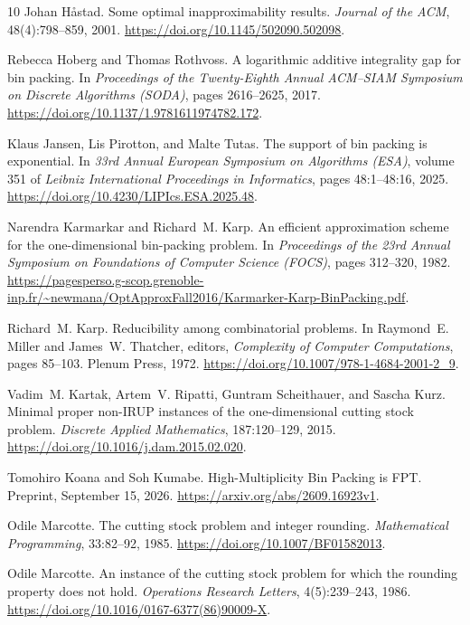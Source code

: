 \begin{thebibliography}{10}
Johan H\aa stad.
Some optimal inapproximability results.
\emph{Journal of the ACM}, 48(4):798--859, 2001.
\url{https://doi.org/10.1145/502090.502098}.

Rebecca Hoberg and Thomas Rothvoss.
A logarithmic additive integrality gap for bin packing.
In \emph{Proceedings of the Twenty-Eighth Annual ACM--SIAM Symposium on
Discrete Algorithms (SODA)}, pages 2616--2625, 2017.
\url{https://doi.org/10.1137/1.9781611974782.172}.

Klaus Jansen, Lis Pirotton, and Malte Tutas.
The support of bin packing is exponential.
In \emph{33rd Annual European Symposium on Algorithms (ESA)},
volume 351 of \emph{Leibniz International Proceedings in Informatics},
pages 48:1--48:16, 2025.
\url{https://doi.org/10.4230/LIPIcs.ESA.2025.48}.

Narendra Karmarkar and Richard~M. Karp.
An efficient approximation scheme for the one-dimensional bin-packing problem.
In \emph{Proceedings of the 23rd Annual Symposium on Foundations of
Computer Science (FOCS)}, pages 312--320, 1982.
\url{https://pagesperso.g-scop.grenoble-inp.fr/~newmana/OptApproxFall2016/Karmarker-Karp-BinPacking.pdf}.

Richard~M. Karp.
Reducibility among combinatorial problems.
In Raymond~E. Miller and James~W. Thatcher, editors,
\emph{Complexity of Computer Computations}, pages 85--103.
Plenum Press, 1972.
\url{https://doi.org/10.1007/978-1-4684-2001-2_9}.

Vadim~M. Kartak, Artem~V. Ripatti, Guntram Scheithauer, and Sascha Kurz.
Minimal proper non-IRUP instances of the one-dimensional cutting stock problem.
\emph{Discrete Applied Mathematics}, 187:120--129, 2015.
\url{https://doi.org/10.1016/j.dam.2015.02.020}.

Tomohiro Koana and Soh Kumabe.
High-Multiplicity Bin Packing is FPT.
Preprint, September 15, 2026.
\url{https://arxiv.org/abs/2609.16923v1}.

Odile Marcotte.
The cutting stock problem and integer rounding.
\emph{Mathematical Programming}, 33:82--92, 1985.
\url{https://doi.org/10.1007/BF01582013}.

Odile Marcotte.
An instance of the cutting stock problem for which the rounding property
does not hold.
\emph{Operations Research Letters}, 4(5):239--243, 1986.
\url{https://doi.org/10.1016/0167-6377(86)90009-X}.


\end{thebibliography}
